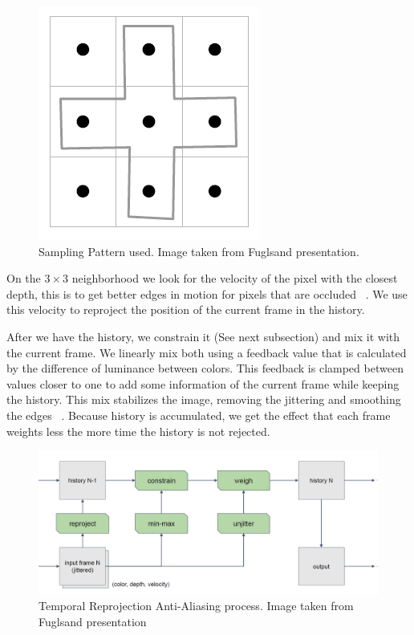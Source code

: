 \documentclass{cslthse-msc}
\begin{document}
\begin{figure}[!hbt]
	\centering
	\includegraphics[scale=0.3]{images/sampling_pattern.png}
	\caption{Sampling Pattern used. Image taken from Fuglsand presentation. \protect\cite{Fuglsand2016}}\label{fig:samplingpattern}
\end{figure}

On the \(3\times 3\) neighborhood we look for the velocity of the pixel with the closest depth, this is to get better edges in motion for pixels that are occluded ~\cite{Fuglsand2016}. We use this velocity to reproject the position of the current frame in the history. ~\cite{Fuglsand2016,XU2016}

After we have the history, we constrain it (See next subsection) and mix it with the current frame. We linearly mix both using a feedback value that is calculated by the difference of luminance between colors. This feedback is clamped between values closer to one to add some information of the current frame while keeping the history. This mix stabilizes the image, removing the jittering and smoothing the edges ~\cite{Fuglsand2016,XU2016}. Because history is accumulated, we get the effect that each frame weights less the more time the history is not rejected. ~\cite{Fuglsand2016}

\begin{figure}[!hbt]
	\centering
	\includegraphics[scale=0.4]{images/sampling_process.png}
	\caption{Temporal Reprojection Anti-Aliasing process. Image taken from Fuglsand presentation \protect\cite{Fuglsand2016}}\label{fig:samplingprocess}
\end{figure}
\end{document}
